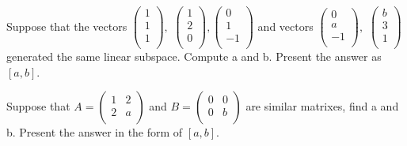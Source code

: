 \begin{problem}Suppose that the vectors
$\left(
   \begin{array}{c}
     1 \\      1 \\     1 \\
   \end{array}
 \right),
$
$\left(
   \begin{array}{c}
     1 \\     2 \\     0 \\
   \end{array}
 \right),
$$\left(
   \begin{array}{c}
     0 \\     1 \\      -1 \\
   \end{array}
 \right)
$ and vectors
$\left(
   \begin{array}{c}
     0 \\     a \\     -1 \\
   \end{array}
 \right),
$
$\left(
   \begin{array}{c}
     b \\     3 \\     1 \\
   \end{array}
 \right)
$ generated the same linear subspace. Compute a and b. Present the answer as $[a,b]$. 
\end{problem}

\begin{problem} Suppose that
$A=\left(
    \begin{array}{cc}
      1 & 2 \\
      2& a \\
    \end{array}
  \right)
$ and $B=\left(
    \begin{array}{cc}
      0 & 0 \\
      0& b \\
    \end{array}
  \right)$
  are similar matrixes, find a and b. Present the answer in the form of $[a,b]$. 
\end{problem}

